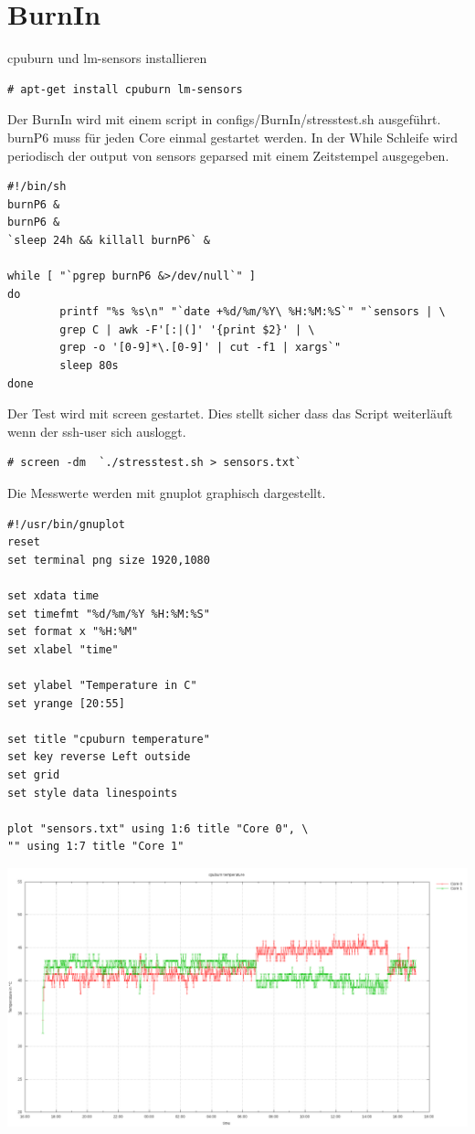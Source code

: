 \section{BurnIn}
cpuburn und lm-sensors installieren 
\begin{lstlisting}[style=Bash]
# apt-get install cpuburn lm-sensors
\end{lstlisting}
Der BurnIn wird mit einem script in configs/BurnIn/stresstest.sh ausgeführt.\\
burnP6 muss für jeden Core einmal gestartet werden. In der While Schleife wird periodisch der output von sensors geparsed mit einem Zeitstempel ausgegeben.
\begin{lstlisting}[style=Bash]
#!/bin/sh
burnP6 &
burnP6 &
`sleep 24h && killall burnP6` &

while [ "`pgrep burnP6 &>/dev/null`" ]
do
        printf "%s %s\n" "`date +%d/%m/%Y\ %H:%M:%S`" "`sensors | \
		grep C | awk -F'[:|(]' '{print $2}' | \
		grep -o '[0-9]*\.[0-9]' | cut -f1 | xargs`"
        sleep 80s
done
\end{lstlisting}
Der Test wird mit screen gestartet. Dies stellt sicher dass das Script weiterläuft wenn der ssh-user sich ausloggt.
\begin{lstlisting}[style=Bash]
# screen -dm  `./stresstest.sh > sensors.txt`
\end{lstlisting}
Die Messwerte werden mit gnuplot graphisch dargestellt.
\begin{lstlisting}[style=Bash]
#!/usr/bin/gnuplot
reset
set terminal png size 1920,1080

set xdata time
set timefmt "%d/%m/%Y %H:%M:%S"
set format x "%H:%M"
set xlabel "time"

set ylabel "Temperature in C"
set yrange [20:55]

set title "cpuburn temperature"
set key reverse Left outside
set grid
set style data linespoints

plot "sensors.txt" using 1:6 title "Core 0", \
"" using 1:7 title "Core 1"
\end{lstlisting}
\includegraphics[width=\textwidth,height=\textheight,keepaspectratio]{../aufgabe1/BurnIn/png_single_core.png}
